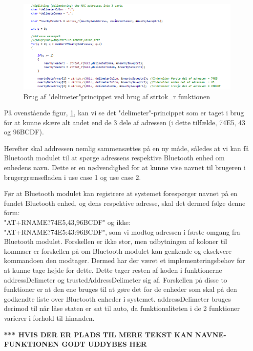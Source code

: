 \begin{figure}[H]
	\centering
	\includegraphics[width = 500 pt]{Img/delimetering.PNG}
	\caption{Brug af "delimeter"\-princippet ved brug af strtok\_r funktionen}
	\label{fig:delimeter}
\end{figure}

På ovenstående figur, \ref{fig:delimeter}, kan vi se det "delimeter"-princippet som er taget i brug for at kunne skære alt andet end de 3 dele af adressen (i dette tilfælde, 74E5, 43 og 96BCDF).

Herefter skal addressen nemlig sammensættes på en ny måde, således at vi kan få Bluetooth modulet til at spørge adressens respektive Bluetooth enhed om enhedens navn. Dette er en nødvendighed for at kunne vise navnet til brugeren i brugergrænsefladen i use case 1 og use case 2.

Før at Bluetooth modulet kan registrere at systemet forespørger navnet på en fundet Bluetooth enhed, og dens respektive adresse, skal det dermed følge denne form:\\ "AT+RNAME?74E5,43,96BCDF" og ikke:\\ "AT+RNAME?74E5:43:96BCDF", som vi modtog adressen i første omgang fra Bluetooth modulet. Forskellen er ikke stor, men udbytningen af koloner til kommaer er forskellen på om Bluetooth modulet kan genkende og eksekvere kommandoen den modtager. Dermed har der været et implementeringsbehov for at kunne tage højde for dette. Dette tager resten af koden i funktionerne addressDelimeter og trustedAddressDelimeter sig af. Forskellen på disse to funktioner er at den ene bruges til at gøre det for de enheder som skal på den godkendte liste over Bluetooth enheder i systemet. addressDelimeter bruges derimod til når låse staten er sat til auto, da funktionaliteten i de 2 funktioner varierer i forhold til hinanden.

\textbf{*** HVIS DER ER PLADS TIL MERE TEKST KAN NAVNE-FUNKTIONEN GODT UDDYBES HER}

